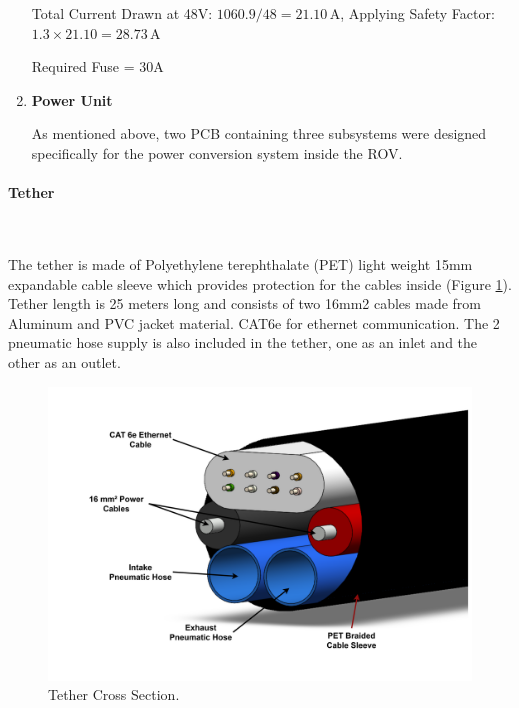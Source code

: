 \begin{enumerate}[label=(\roman*), leftmargin=0pt, itemindent=20pt]
    Total Current Drawn at 48V: \( 1060.9 / 48 = 21.10 \, \text{A} \), Applying Safety Factor: \( 1.3 \times 21.10 = 28.73 \, \text{A} \)
    \setlength{\parskip}{0pt}

    Required Fuse = 30A

    \item \textbf{Power Unit}
    
    As mentioned above, two PCB containing three subsystems were designed specifically for the power conversion system inside the ROV.
\end{enumerate}

\paragraph{Tether} \ \\
\vspace{-0.5cm}

The tether is made of Polyethylene terephthalate (PET) light weight 15mm expandable cable sleeve which provides protection for the cables inside (Figure \ref{fig:tether}). Tether length is 25 meters long and consists of two 16mm2 cables made from Aluminum and PVC jacket material. CAT6e for ethernet communication. The 2 pneumatic hose supply is also included in the tether, one as an inlet and the other as an outlet.

\begin{figure}[h!]
    \centering
    \includegraphics[width=0.8\columnwidth]{Sections/2Design Rationale/images/Tether.png}
    \caption{Tether Cross Section.}
    \label{fig:tether}
\end{figure}